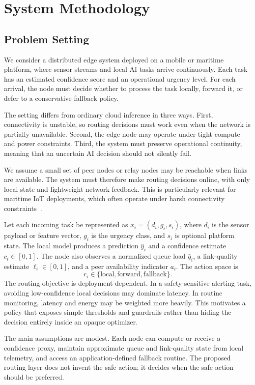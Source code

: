 \documentclass[10pt, conference]{IEEEtran}
\begin{document}
\section{System Methodology}
\subsection{Problem Setting}
We consider a distributed edge system deployed on a mobile or maritime platform, where sensor streams and local AI tasks arrive continuously. Each task has an estimated confidence score and an operational urgency level. For each arrival, the node must decide whether to process the task locally, forward it, or defer to a conservative fallback policy.

The setting differs from ordinary cloud inference in three ways. First, connectivity is unstable, so routing decisions must work even when the network is partially unavailable. Second, the edge node may operate under tight compute and power constraints. Third, the system must preserve operational continuity, meaning that an uncertain AI decision should not silently fail.

We assume a small set of peer nodes or relay nodes may be reachable when links are available. The system must therefore make routing decisions online, with only local state and lightweight network feedback. This is particularly relevant for maritime IoT deployments, which often operate under harsh connectivity constraints~\cite{li2019maritimeiot}.

Let each incoming task be represented as $x_i=(d_i,g_i,s_i)$, where $d_i$ is the sensor payload or feature vector, $g_i$ is the urgency class, and $s_i$ is optional platform state. The local model produces a prediction $\hat{y}_i$ and a confidence estimate $c_i\in[0,1]$. The node also observes a normalized queue load $\bar{q}_i$, a link-quality estimate $\ell_i\in[0,1]$, and a peer availability indicator $a_i$. The action space is
\begin{equation}
    r_i \in \{\text{local}, \text{forward}, \text{fallback}\}.
\end{equation}
The routing objective is deployment-dependent. In a safety-sensitive alerting task, avoiding low-confidence local decisions may dominate latency. In routine monitoring, latency and energy may be weighted more heavily. This motivates a policy that exposes simple thresholds and guardrails rather than hiding the decision entirely inside an opaque optimizer.

The main assumptions are modest. Each node can compute or receive a confidence proxy, maintain approximate queue and link-quality state from local telemetry, and access an application-defined fallback routine. The proposed routing layer does not invent the safe action; it decides when the safe action should be preferred.
\end{document}
